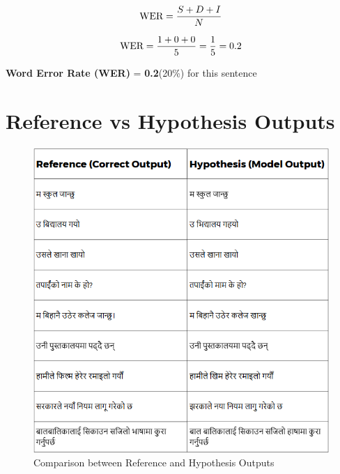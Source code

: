 \begin{equation}
\text{WER} = \frac{S + D + I}{N}\\
\end{equation}

\begin{equation}
\text{WER} = \frac{1 + 0 + 0}{5} = \frac{1}{5} = 0.2\\
\end{equation}

 \textbf{Word Error Rate (WER)} = \textbf{0.2}(20\%) for this sentence \\








\section{Reference vs Hypothesis Outputs}

\begin{figure}[H]  %
    \centering
    \includegraphics[width=\textwidth]{Images/output.png}
    \caption{Comparison between Reference and Hypothesis Outputs}
    \label{fig:ref_vs_hyp}
\end{figure}








